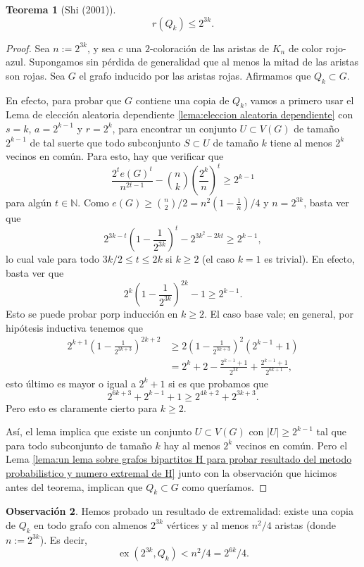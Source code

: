 \documentclass[12pt]{report}
\theoremstyle{plain}
\newtheorem{theorem}{Teorema}[section]
\theoremstyle{definition}
\newtheorem{obs}[theorem]{Observación}
\newcommand{\naturals}{\mathbb{N}}
\newcommand{\abs}[1]{\left \vert #1 \right \vert}
\newcommand{\ex}[2]{\operatorname{ex} (#1, #2)}
\begin{document}
\begin{theorem}[Shi (2001)]
    \[
    r(Q_k) \leq 2^{3k}.
    \]
\end{theorem}
\begin{proof}
Sea $n := 2^{3k}$, y sea $c$ una $2$-coloración de las aristas de $K_n$ de color rojo-azul. Supongamos sin pérdida de generalidad que al menos la mitad de las aristas son rojas. Sea $G$ el grafo inducido por las aristas rojas. Afirmamos que $Q_k \subset G$.

En efecto, para probar que $G$ contiene una copia de $Q_k$, vamos a primero usar el Lema de elección aleatoria dependiente \ref{lema:eleccion aleatoria dependiente} con $s = k$, $a = 2^{k-1}$ y $r = 2^k$, para encontrar un conjunto $U \subset V(G)$ de tamaño $2^{k-1}$ de tal suerte que todo subconjunto $S \subset U$ de tamaño $k$ tiene al menos $2^k$ vecinos en común. Para esto, hay que verificar que
\[
    \frac{2^t e(G)^t}{n^{2t-1}} - \binom n k \left ( \frac{2^k}{n} \right )^t \geq 2^{k-1}
\]
para algún $t \in \naturals$. Como  $e(G) \geq \binom n 2 / 2 = n^2(1-\frac 1 n)/4$ y $n = 2^{3k}$, basta ver que
\[
2^{3k-t}(1- \frac{1}{2^{3k}})^t - 2^{3k^2 - 2k t} \geq 2^{k-1},
\]
lo cual vale para todo $3 k /2 \leq t \leq 2k$ si $k \geq 2$ (el caso $k = 1$ es trivial). En efecto, basta ver que
\[
    2^k (1- \frac 1 {2^{3k}})^{2k} - 1 \geq 2^{k-1}.
\]
Esto se puede probar porp inducción en $k \geq 2$. El caso base vale; en general, por hipótesis inductiva tenemos que
\begin{align*}
2^{k+1} (1- \frac {1}{2^{3k + 3}})^{2k + 2} &\geq 2 (1- \frac{1}{2^{3k+3}})^2 (2^{k-1} + 1) \\
&= 2^k + 2 - \frac{2^{k-1}+ 1}{2^{3k}} + \frac{2^{k-1} + 1}{2^{6k + 1}},
\end{align*}
esto último es mayor o igual a $2^k + 1$ si es que probamos que
\[
    2^{6k + 3} + 2^{k-1} + 1 \geq 2^{4k + 2} + 2^{3k + 3}.
\]
Pero esto es claramente cierto para $k \geq 2$.

Así, el lema implica que existe un conjunto $U \subset V(G)$ con $\abs U \geq 2^{k-1} $ tal que para todo subconjunto de tamaño $k$ hay al menos $2^k$ vecinos en común. Pero el Lema \ref{lema:un lema sobre grafos bipartitos H para probar resultado del metodo probabilistico y numero extremal de H} junto con la observación que hicimos antes del teorema, implican que $Q_k \subset G$ como queríamos.
\end{proof}

\begin{obs}
Hemos probado un resultado de extremalidad: existe una copia de $Q_k$ en todo grafo con almenos $2^{3k}$ vértices y al menos $n^2/4$ aristas (donde $n := 2^{3k}$). Es decir,
\[
    \ex {2^{3k}}{Q_k} < n^2 / 4 = 2^{6k}/4.
\]
\end{obs}
\end{document}
